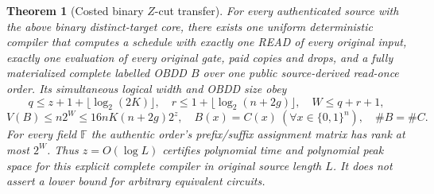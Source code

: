 \documentclass[11pt]{article}
\newtheorem{theorem}{Theorem}
\begin{document}
\begin{theorem}[Costed binary $Z$-cut transfer]
For every authenticated source with the above binary distinct-target
core, there exists one uniform deterministic compiler that computes
a schedule with exactly one READ of every original input, exactly one
evaluation of every original gate, paid copies and drops, and a
fully materialized complete labelled OBDD $B$ over one public
source-derived read-once order. Its simultaneous logical width and
OBDD size obey
\[
 q\le z+1+\lfloor\log_2(2K)\rfloor,\quad
 r\le1+\lfloor\log_2(n+2g)\rfloor,\quad W\le q+r+1,
\]
\[
 V(B)\le n2^W\le16nK(n+2g)2^z,\quad
 B(x)=C(x)\ (\forall x\in\{0,1\}^n),\quad\#B=\#C.
\]
For every field $\mathbb F$ the authentic order's prefix/suffix
assignment matrix has rank at most $2^W$. Thus $z=O(\log L)$
certifies polynomial time and polynomial peak space for this
explicit complete compiler in original source length $L$.
It does not assert a lower bound for arbitrary equivalent circuits.
\end{theorem}
\end{document}
